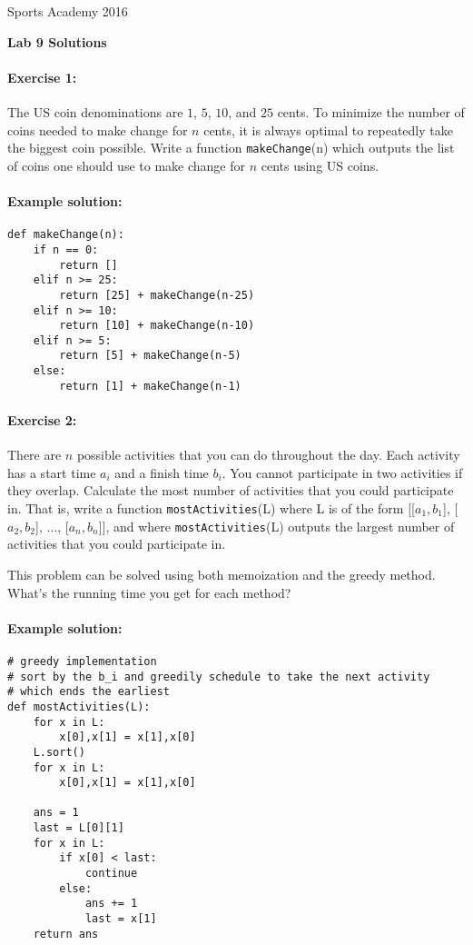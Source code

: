 \documentclass[11pt]{article}
\newlength{\toppush}
\newcommand{\htitle}[2]{\noindent\vspace*{-\toppush}\newline\parbox{6.5in}
 {\large Sports Academy \hfill #1\newline
\hspace*{\fill}{\bf Algorithms and Programming for High Schoolers} \hspace*{\fill} \newline
\mbox{}\hrulefill\mbox{}}\vspace*{1ex}\mbox{}\newline
\begin{center}{\Large\bf #2}\end{center}}
\begin{document}
\htitle{2016}{Lab 9 Solutions}

\paragraph{Exercise 1:}
The US coin denominations are $1$, $5$, $10$, and $25$ cents.  To
minimize the number of coins needed to make change for $n$ cents, it
is always optimal to repeatedly take the biggest coin possible.  Write
a function \texttt{makeChange}(n) which outputs the list of coins one
should use to make change for $n$ cents using US coins.

\paragraph{Example solution:}
\begin{verbatim}
def makeChange(n):
    if n == 0:
        return []
    elif n >= 25:
        return [25] + makeChange(n-25)
    elif n >= 10:
        return [10] + makeChange(n-10)
    elif n >= 5:
        return [5] + makeChange(n-5)
    else:
        return [1] + makeChange(n-1)
\end{verbatim}

\paragraph{Exercise 2:}
There are $n$ possible activities that you can do throughout the day.
Each activity has a start time $a_i$ and a finish time $b_i$.  You
cannot participate in two activities if they overlap.  Calculate the
most number of activities that you could participate in.  That is,
write a function \texttt{mostActivities}(L) where L is of the form
[[$a_1,b_1$], [$a_2,b_2$], $\ldots$, [$a_n, b_n$]], and where
\texttt{mostActivities}(L) outputs the largest number of activities
that you could participate in.

This problem can be solved using both memoization and the greedy
method.  What's the running time you get for each method?

\paragraph{Example solution:}
\begin{verbatim}
# greedy implementation
# sort by the b_i and greedily schedule to take the next activity
# which ends the earliest
def mostActivities(L):
    for x in L:
        x[0],x[1] = x[1],x[0]
    L.sort()
    for x in L:
        x[0],x[1] = x[1],x[0]

    ans = 1
    last = L[0][1]
    for x in L:
        if x[0] < last:
            continue
        else:
            ans += 1
            last = x[1]
    return ans
\end{verbatim}
\end{document}
